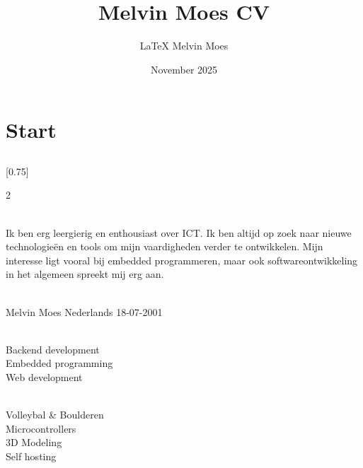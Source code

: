 \documentclass[lighthipster]{simplehipstercv}
\title{Melvin Moes CV}
\author{\LaTeX{} Melvin Moes}
\date{November 2025}
\begin{document}
    \section*{Start}

    \subsection*{}
    \vspace{4em}

    \setlength{\columnsep}{1.5cm} %
    [0.75]
    \begin{paracol}{2}
        \paracolbackgroundoptions
        \footnotesize
        {\setasidefontcolour
            \flushright
            \begin{center}
            \end{center}

            \\[0.5em]

            {\footnotesize
                Ik ben erg leergierig en enthousiast over ICT. Ik ben altijd op zoek naar nieuwe technologieën 
                en tools om mijn vaardigheden verder te ontwikkelen. Mijn interesse ligt vooral bij embedded programmeren, 
                maar ook softwareontwikkeling in het algemeen spreekt mij erg aan.
            }
            \bigskip

             \\[0.5em]
            Melvin Moes
            Nederlands
            18-07-2001

            \bigskip

             \\[0.5em]

            Backend development \\ Embedded programming \\ Web development 

            \bigskip
            \bigskip

            \\[0.5em]

            Volleybal \& Boulderen\\
            Microcontrollers\\
            3D Modeling\\
            Self hosting


}
\end{paracol}
\end{document}
